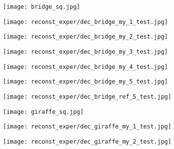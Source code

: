 \begin{figure}[H]
	\centering
	\begin{subfigure}[b]{0.13\linewidth}
		\texttt{[image: bridge\_sq.jpg]} %
	\end{subfigure}
	\begin{subfigure}[b]{0.13\linewidth}
		\texttt{[image: reconst\_exper/dec\_bridge\_my\_1\_test.jpg]} %
	\end{subfigure}
	\begin{subfigure}[b]{0.13\linewidth}
		\texttt{[image: reconst\_exper/dec\_bridge\_my\_2\_test.jpg]} %
	\end{subfigure}
	\begin{subfigure}[b]{0.13\linewidth}
		\texttt{[image: reconst\_exper/dec\_bridge\_my\_3\_test.jpg]} %
	\end{subfigure}
	\begin{subfigure}[b]{0.13\linewidth}
		\texttt{[image: reconst\_exper/dec\_bridge\_my\_4\_test.jpg]} %
	\end{subfigure}
	\begin{subfigure}[b]{0.13\linewidth}
		\texttt{[image: reconst\_exper/dec\_bridge\_my\_5\_test.jpg]} %
	\end{subfigure}
	\begin{subfigure}[b]{0.13\linewidth}
		\texttt{[image: reconst\_exper/dec\_bridge\_ref\_5\_test.jpg]} %
	\end{subfigure}
	\centering
	\begin{subfigure}[b]{0.13\linewidth}
		\texttt{[image: giraffe\_sq.jpg]} %
	\end{subfigure}
	\begin{subfigure}[b]{0.13\linewidth}
		\texttt{[image: reconst\_exper/dec\_giraffe\_my\_1\_test.jpg]} %
	\end{subfigure}
	\begin{subfigure}[b]{0.13\linewidth}
		\texttt{[image: reconst\_exper/dec\_giraffe\_my\_2\_test.jpg]} %
	\end{subfigure}
	\begin{subfigure}[b]{0.13\linewidth}

\end{subfigure}
\end{figure}
